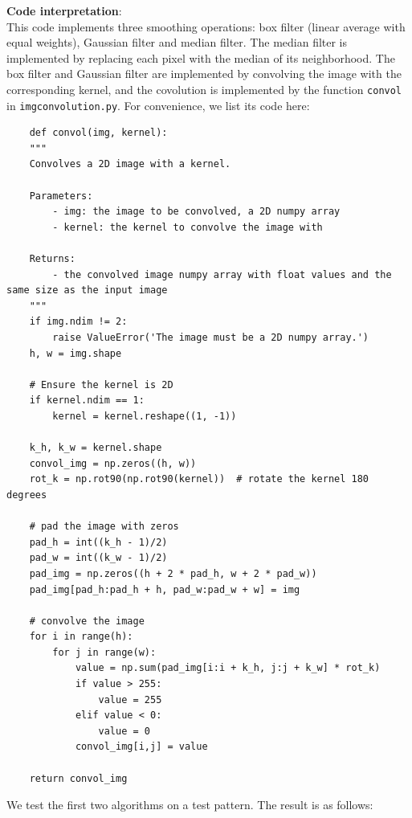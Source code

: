 \documentclass[UTF8]{ctexart}
\begin{document}
\textbf{Code interpretation}:\\
This code implements three smoothing operations: box filter (linear average with equal weights), Gaussian filter and median filter.
The median filter is implemented by replacing each pixel with the median of its neighborhood.
The box filter and Gaussian filter are implemented by convolving the image with the corresponding kernel, and the covolution is implemented by the function \texttt{convol} in \texttt{imgconvolution.py}.
For convenience, we list its code here:
\begin{lstlisting}
    def convol(img, kernel):
    """
    Convolves a 2D image with a kernel.
    
    Parameters:
        - img: the image to be convolved, a 2D numpy array
        - kernel: the kernel to convolve the image with
        
    Returns:
        - the convolved image numpy array with float values and the same size as the input image
    """
    if img.ndim != 2:
        raise ValueError('The image must be a 2D numpy array.')
    h, w = img.shape
    
    # Ensure the kernel is 2D
    if kernel.ndim == 1:
        kernel = kernel.reshape((1, -1))

    k_h, k_w = kernel.shape
    convol_img = np.zeros((h, w))
    rot_k = np.rot90(np.rot90(kernel))  # rotate the kernel 180 degrees
    
    # pad the image with zeros
    pad_h = int((k_h - 1)/2)
    pad_w = int((k_w - 1)/2)
    pad_img = np.zeros((h + 2 * pad_h, w + 2 * pad_w))
    pad_img[pad_h:pad_h + h, pad_w:pad_w + w] = img
    
    # convolve the image
    for i in range(h):
        for j in range(w):
            value = np.sum(pad_img[i:i + k_h, j:j + k_w] * rot_k)
            if value > 255:
                value = 255
            elif value < 0:
                value = 0
            convol_img[i,j] = value
            
    return convol_img
\end{lstlisting}
We test the first two algorithms on a test pattern. The result is as follows:\\
\end{document}
